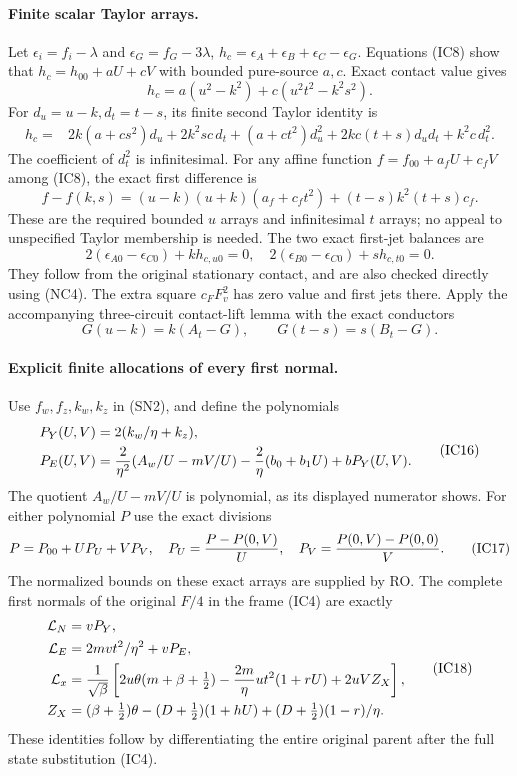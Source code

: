 \paragraph{Finite scalar Taylor arrays.}
Let $\epsilon_i=f_i-\lambda$ and $\epsilon_G=f_G-3\lambda$,
$h_c=\epsilon_A+\epsilon_B+\epsilon_C-\epsilon_G$.
Equations (IC8) show that $h_c=h_{00}+aU+cV$ with bounded
pure-source $a,c$. Exact contact value gives
\[
 h_c=a(u^2-k^2)+c(u^2t^2-k^2s^2).                     \tag{IC11}
\]
For $d_u=u-k,d_t=t-s$, its finite second Taylor identity is
\[
\begin{split}
 h_c={}&2k(a+cs^2)d_u+2k^2sc\,d_t
 +(a+ct^2)d_u^2+2kc(t+s)d_ud_t+k^2c\,d_t^2.            \end{split} \tag{IC12}
\]
The coefficient of $d_t^2$ is infinitesimal. For any affine function
$f=f_{00}+a_fU+c_fV$ among (IC8), the exact first difference is
\[
 f-f(k,s)=(u-k)(u+k)(a_f+c_ft^2)
                    +(t-s)k^2(t+s)c_f.                \tag{IC13}
\]
These are the required bounded $u$ arrays and infinitesimal $t$ arrays;
no appeal to unspecified Taylor membership is needed.
The two exact first-jet balances are
\[
 2(\epsilon_{A0}-\epsilon_{C0})+k h_{c,u0}=0,
 \quad 2(\epsilon_{B0}-\epsilon_{C0})+s h_{c,t0}=0.      \tag{IC14}
\]
They follow from the original stationary contact, and are also checked
directly using (NC4). The extra square $c_FF_v^2$ has zero value and
first jets there. Apply the accompanying three-circuit contact-lift
lemma with the exact conductors
\[
 G(u-k)=k(A_t-G),\qquad G(t-s)=s(B_t-G).                \tag{IC15}
\]

\paragraph{Explicit finite allocations of every first normal.}
Use $f_w,f_z,k_w,k_z$ in (SN2), and define the polynomials
\[
\begin{aligned}
 P_Y(U,V)&=2(k_w/\eta+k_z),\\
 P_E(U,V)&={2\over\eta^2}(A_w/U-mV/U)
              -{2\over\eta}(b_0+b_1U)+bP_Y(U,V).
\end{aligned}                                                   \tag{IC16}
\]
The quotient $A_w/U-mV/U$ is polynomial, as its displayed numerator
shows. For either polynomial $P$ use the exact divisions
\[
 P=P_{00}+UP_U+VP_V,\quad
 P_U={P-P(0,V)\over U},\quad
 P_V={P(0,V)-P(0,0)\over V}.                           \tag{IC17}
\]
The normalized bounds on these exact arrays are supplied by RO. The complete first normals
of the original $F/4$ in the frame (IC4) are exactly
\[
\begin{aligned}
 \mathcal L_N&=vP_Y,\\
 \mathcal L_E&=2mv t^2/\eta^2+vP_E,\\
 \mathcal L_x&={1\over\sqrt\beta}\left[
 2u\theta(m+\beta+\tfrac12)
 -{2m\over\eta}ut^2(1+rU)+2uVZ_X\right],\\
 Z_X&=(\beta+\tfrac12)\theta-(D+\tfrac12)(1+hU)
                         +(D+\tfrac12)(1-r)/\eta .     \end{aligned} \tag{IC18}
\]
These identities follow by differentiating the entire original parent
after the full state substitution (IC4).

